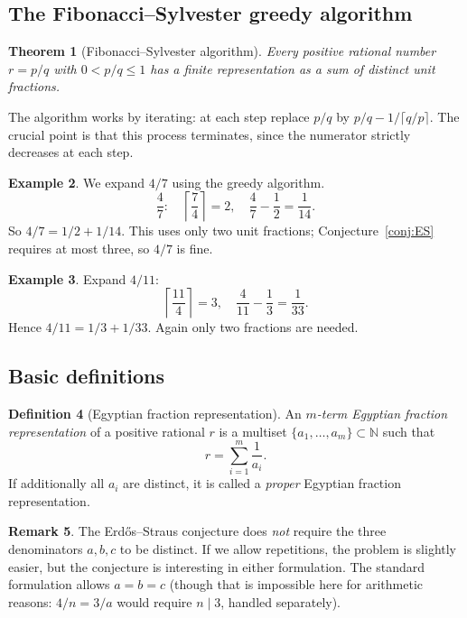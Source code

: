 \documentclass[12pt,a4paper]{amsart}
\newtheorem{theorem}{Theorem}[section]
\theoremstyle{definition}
\newtheorem{definition}[theorem]{Definition}
\newtheorem{example}[theorem]{Example}
\newtheorem{remark}[theorem]{Remark}
\newcommand{\N}{\mathbb{N}}
\begin{document}
\subsection{The Fibonacci--Sylvester greedy algorithm}

\begin{theorem}[Fibonacci--Sylvester algorithm]\label{thm:sylvester}
Every positive rational number $r = p/q$ with $0 < p/q \leq 1$ has a
finite representation as a sum of distinct unit fractions.
\end{theorem}

The algorithm works by iterating: at each step replace $p/q$ by
$p/q - 1/\lceil q/p \rceil$.  The crucial point is that this process
terminates, since the numerator strictly decreases at each step.

\begin{example}
We expand $4/7$ using the greedy algorithm.
\[
  \frac{4}{7}: \quad \left\lceil \frac{7}{4} \right\rceil = 2,
  \quad \frac{4}{7} - \frac{1}{2} = \frac{1}{14}.
\]
So $4/7 = 1/2 + 1/14$.  This uses only two unit fractions;
Conjecture~\ref{conj:ES} requires at most three, so $4/7$ is fine.
\end{example}

\begin{example}
Expand $4/11$:
\[
  \left\lceil \frac{11}{4} \right\rceil = 3,\quad
  \frac{4}{11} - \frac{1}{3} = \frac{1}{33}.
\]
Hence $4/11 = 1/3 + 1/33$.  Again only two fractions are needed.
\end{example}

\subsection{Basic definitions}

\begin{definition}[Egyptian fraction representation]
An \emph{$m$-term Egyptian fraction representation} of a positive
rational $r$ is a multiset $\{a_1, \ldots, a_m\} \subset \N$ such that
\[
  r = \sum_{i=1}^{m} \frac{1}{a_i}.
\]
If additionally all $a_i$ are distinct, it is called a \emph{proper}
Egyptian fraction representation.
\end{definition}

\begin{remark}
The Erd\H{o}s--Straus conjecture does \emph{not} require the three
denominators $a, b, c$ to be distinct.  If we allow repetitions,
the problem is slightly easier, but the conjecture is interesting in
either formulation.  The standard formulation allows $a = b = c$
(though that is impossible here for arithmetic reasons: $4/n = 3/a$
would require $n \mid 3$, handled separately).
\end{remark}
\end{document}
